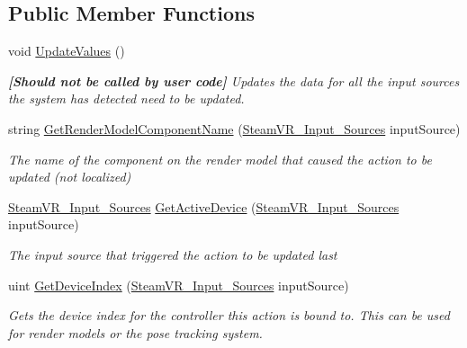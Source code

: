 \subsection*{Public Member Functions}
\begin{DoxyCompactItemize}
\item 
void \mbox{\hyperlink{interface_valve_1_1_v_r_1_1_i_steam_v_r___action___in_a89831097965f96913740960fa6549c27}{Update\+Values}} ()
\begin{DoxyCompactList}\small\item\em {\bfseries{\mbox{[}Should not be called by user code\mbox{]}}} Updates the data for all the input sources the system has detected need to be updated. \end{DoxyCompactList}\item 
string \mbox{\hyperlink{interface_valve_1_1_v_r_1_1_i_steam_v_r___action___in_a944e45d5e2e494a1bfd8d71989fe6926}{Get\+Render\+Model\+Component\+Name}} (\mbox{\hyperlink{namespace_valve_1_1_v_r_a82e5bf501cc3aa155444ee3f0662853f}{Steam\+V\+R\+\_\+\+Input\+\_\+\+Sources}} input\+Source)
\begin{DoxyCompactList}\small\item\em The name of the component on the render model that caused the action to be updated (not localized) \end{DoxyCompactList}\item 
\mbox{\hyperlink{namespace_valve_1_1_v_r_a82e5bf501cc3aa155444ee3f0662853f}{Steam\+V\+R\+\_\+\+Input\+\_\+\+Sources}} \mbox{\hyperlink{interface_valve_1_1_v_r_1_1_i_steam_v_r___action___in_ad0ed3e6765d11920e94e259f6ee6b7c4}{Get\+Active\+Device}} (\mbox{\hyperlink{namespace_valve_1_1_v_r_a82e5bf501cc3aa155444ee3f0662853f}{Steam\+V\+R\+\_\+\+Input\+\_\+\+Sources}} input\+Source)
\begin{DoxyCompactList}\small\item\em The input source that triggered the action to be updated last \end{DoxyCompactList}\item 
uint \mbox{\hyperlink{interface_valve_1_1_v_r_1_1_i_steam_v_r___action___in_ab21c1d79f19d11a4d3ee53d373c62cb4}{Get\+Device\+Index}} (\mbox{\hyperlink{namespace_valve_1_1_v_r_a82e5bf501cc3aa155444ee3f0662853f}{Steam\+V\+R\+\_\+\+Input\+\_\+\+Sources}} input\+Source)
\begin{DoxyCompactList}\small\item\em Gets the device index for the controller this action is bound to. This can be used for render models or the pose tracking system. \end{DoxyCompactList}\item 

\end{DoxyCompactItemize}
